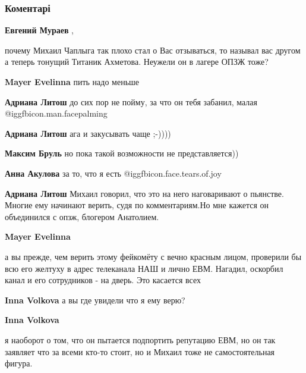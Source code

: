  
 
 
 
 
\subsubsection{Коментарі}

\begin{itemize} %
\textbf{Евгений Мураев} , 

почему Михаил Чаплыга так плохо стал о Вас отзываться, то называл вас другом а
теперь тонущий Титаник Ахметова. Неужели он в лагере ОПЗЖ тоже?

\begin{itemize} %
\textbf{Mayer Evelinna} пить надо меньше

\textbf{Адриана Литош} до сих пор не пойму, за что он тебя забанил, малая @igg{fbicon.man.facepalming} 

\textbf{Адриана Литош} ага и закусывать чаще ;-))))

\textbf{Максим Бруль} но пока такой возможности не представляется))

\textbf{Анна Акулова} за то, что я есть  @igg{fbicon.face.tears.of.joy} 

\textbf{Адриана Литош} Михаил говорил, что это на него наговаривают о пьянстве. Многие ему начинают верить, судя по комментариям.Но мне кажется он объединился с опзж, блогером Анатолием.

\textbf{Mayer Evelinna} 

а вы прежде, чем верить этому фейкомёту с вечно красным лицом, проверили бы всю
его желтуху в адрес телеканала НАШ и лично ЕВМ. Нагадил, оскорбил канал и его
сотрудников - на дверь. Это касается всех

\textbf{Inna Volkova} а вы где увидели что я ему верю?

\textbf{Inna Volkova} 

я наоборот о том, что он пытается подпортить репутацию ЕВМ, но он так заявляет
что за всеми кто-то стоит, но и Михаил тоже не самостоятельная фигура.


\end{itemize}
\end{itemize}
